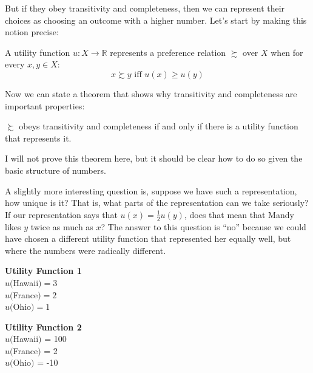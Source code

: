 But if they obey transitivity and completeness, then we can represent their choices as choosing an outcome with a higher number.  Let's start by making this notion precise:

\begin{definition}
\label{d:util-representation}
A utility function $u: X \to \mathbb{R}$ represents a preference relation $\succsim$ over $X$ when for every $x, y \in X$:
\[ x \succsim y \text{ iff } u(x) \geq u(y) \]
\end{definition}


Now we can state a theorem that shows why transitivity and completeness are important properties:

\begin{proposition}
$\succsim$ obeys transitivity and completeness if and only if there is a utility function that represents it.
\end{proposition}

I will not prove this theorem here, but it should be clear how to do so given the basic structure of numbers.  

A slightly more interesting question is, suppose we have such a representation, how unique is it?  That is, what parts of the representation can we take seriously?  If our representation says that $u(x) = \frac{1}{2} u(y)$, does that mean that Mandy likes $y$ twice as much as $x$?  The answer to this question is ``no'' because we could have chosen a different utility function that represented her equally well, but where the numbers were radically different.

\begin{marginfigure}
    \begin{centering}
   {\bf Utility Function 1}\\
    $u($Hawaii$) = 3$\\
    $u($France$) = 2$\\
    $u($Ohio$) = 1$\\
    \end{centering}
\vspace{10pt}
    \begin{centering}
    {\bf Utility Function 2}\\
    
    $u($Hawaii$)$ = 100\\
    $u($France$)$ = 2\\
    $u($Ohio$)$ = -10\\
    \end{centering}
    \vspace{10pt}
    \label{f:twoutils}
    \caption{Two utility functions which are both equally valid for Mandy}
\end{marginfigure}

